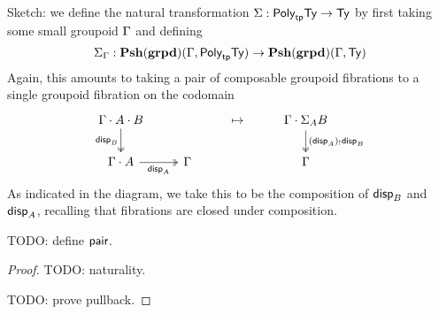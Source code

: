 \begin{defn}[Interpretation of $\Si$]
  Sketch: we define the natural transformation
  $\Sigma : \textsf{Poly}_{\mathsf{tp}} \mathsf{Ty} \to \mathsf{Ty}$
  by first taking some small groupoid $\Gamma$ and defining
  \[\Sigma_{\Gamma} : \mathbf{Psh}(\mathbf{grpd})(\Gamma, \textsf{Poly}_{\mathsf{tp}} \mathsf{Ty}) \to \mathbf{Psh}(\mathbf{grpd})(\Gamma, \mathsf{Ty})\]
  Again,
  this amounts to taking a pair of composable groupoid fibrations
  to a single groupoid fibration on the codomain
  \[\begin{tikzcd}
    {\Ga \cdot A \cdot B} && \mapsto & {\Ga \cdot \Si_A B} \\
    {\Ga \cdot A} & \Ga && \Ga
    \arrow["{\disp{B}}"', two heads, from=1-1, to=2-1]
    \arrow["{(\disp{A})_! \disp{B}}", two heads, from=1-4, to=2-4]
    \arrow["{\disp{A}}"', two heads, from=2-1, to=2-2]
  \end{tikzcd}\]
  As indicated in the diagram, we take this to be the composition of
  $\mathsf{disp}_{B}$ and $\mathsf{disp}_{A}$,
  recalling that fibrations are closed under composition.

  TODO: define $\textsf{pair}$.
\end{defn}
\begin{proof}
  TODO: naturality.

  TODO: prove pullback.
\end{proof}
